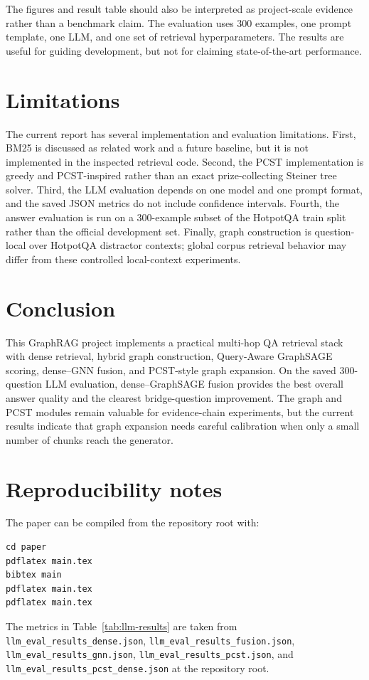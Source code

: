 \documentclass{article}
\begin{document}
The figures and result table should also be interpreted as project-scale evidence rather than a benchmark claim. The evaluation uses 300 examples, one prompt template, one LLM, and one set of retrieval hyperparameters. The results are useful for guiding development, but not for claiming state-of-the-art performance.

\section{Limitations}

The current report has several implementation and evaluation limitations. First, BM25 is discussed as related work and a future baseline, but it is not implemented in the inspected retrieval code. Second, the PCST implementation is greedy and PCST-inspired rather than an exact prize-collecting Steiner tree solver. Third, the LLM evaluation depends on one model and one prompt format, and the saved JSON metrics do not include confidence intervals. Fourth, the answer evaluation is run on a 300-example subset of the HotpotQA train split rather than the official development set. Finally, graph construction is question-local over HotpotQA distractor contexts; global corpus retrieval behavior may differ from these controlled local-context experiments.

\section{Conclusion}

This GraphRAG project implements a practical multi-hop QA retrieval stack with dense retrieval, hybrid graph construction, Query-Aware GraphSAGE scoring, dense--GNN fusion, and PCST-style graph expansion. On the saved 300-question LLM evaluation, dense--GraphSAGE fusion provides the best overall answer quality and the clearest bridge-question improvement. The graph and PCST modules remain valuable for evidence-chain experiments, but the current results indicate that graph expansion needs careful calibration when only a small number of chunks reach the generator.

\section*{Reproducibility notes}

The paper can be compiled from the repository root with:
\begin{verbatim}
cd paper
pdflatex main.tex
bibtex main
pdflatex main.tex
pdflatex main.tex
\end{verbatim}
The metrics in Table~\ref{tab:llm-results} are taken from \texttt{llm\_eval\_results\_dense.json}, \texttt{llm\_eval\_results\_fusion.json}, \texttt{llm\_eval\_results\_gnn.json}, \texttt{llm\_eval\_results\_pcst.json}, and \texttt{llm\_eval\_results\_pcst\_dense.json} at the repository root.
\end{document}
